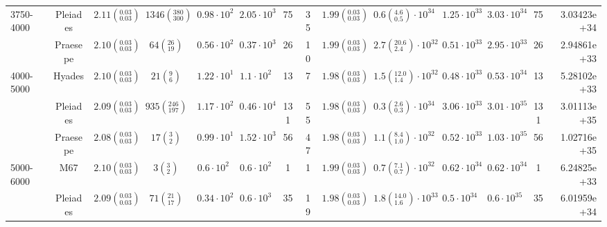 \begin{tabular}{lccccccccccccr}
3750-4000 & Pleiades &  $2.11\left(^{0.03}_{0.03}\right)$ &    $1346\left(^{380}_{300}\right)$ &    $0.98\cdot 10^{2}$ &    $2.05\cdot 10^{3}$ &                 75 &                 35 &  $1.99\left(^{0.03}_{0.03}\right)$ &   $0.6\left(^{4.6}_{0.5}\right)\cdot 10^{34}$ &       $1.25\cdot 10^{33}$ &       $3.03\cdot 10^{34}$ &                   75 &          3.03423e+34 \\
          & Praesepe &  $2.10\left(^{0.03}_{0.03}\right)$ &        $64\left(^{26}_{19}\right)$ &    $0.56\cdot 10^{2}$ &    $0.37\cdot 10^{3}$ &                 26 &                 10 &  $1.99\left(^{0.03}_{0.03}\right)$ &  $2.7\left(^{20.6}_{2.4}\right)\cdot 10^{32}$ &       $0.51\cdot 10^{33}$ &       $2.95\cdot 10^{33}$ &                   26 &          2.94861e+33 \\
4000-5000 & Hyades &  $2.10\left(^{0.03}_{0.03}\right)$ &          $21\left(^{9}_{6}\right)$ &    $1.22\cdot 10^{1}$ &     $1.1\cdot 10^{2}$ &                 13 &                  7 &  $1.98\left(^{0.03}_{0.03}\right)$ &  $1.5\left(^{12.0}_{1.4}\right)\cdot 10^{32}$ &       $0.48\cdot 10^{33}$ &       $0.53\cdot 10^{34}$ &                   13 &          5.28102e+33 \\
          & Pleiades &  $2.09\left(^{0.03}_{0.03}\right)$ &     $935\left(^{246}_{197}\right)$ &    $1.17\cdot 10^{2}$ &    $0.46\cdot 10^{4}$ &                131 &                 55 &  $1.98\left(^{0.03}_{0.03}\right)$ &   $0.3\left(^{2.6}_{0.3}\right)\cdot 10^{34}$ &       $3.06\cdot 10^{33}$ &       $3.01\cdot 10^{35}$ &                  131 &          3.01113e+35 \\
          & Praesepe &  $2.08\left(^{0.03}_{0.03}\right)$ &          $17\left(^{3}_{2}\right)$ &    $0.99\cdot 10^{1}$ &    $1.52\cdot 10^{3}$ &                 56 &                 47 &  $1.98\left(^{0.03}_{0.03}\right)$ &   $1.1\left(^{8.4}_{1.0}\right)\cdot 10^{32}$ &       $0.52\cdot 10^{33}$ &       $1.03\cdot 10^{35}$ &                   56 &          1.02716e+35 \\
5000-6000 & M67 &  $2.10\left(^{0.03}_{0.03}\right)$ &           $3\left(^{3}_{2}\right)$ &     $0.6\cdot 10^{2}$ &     $0.6\cdot 10^{2}$ &                  1 &                  1 &  $1.99\left(^{0.03}_{0.03}\right)$ &   $0.7\left(^{7.1}_{0.7}\right)\cdot 10^{32}$ &       $0.62\cdot 10^{34}$ &       $0.62\cdot 10^{34}$ &                    1 &          6.24825e+33 \\
          & Pleiades &  $2.09\left(^{0.03}_{0.03}\right)$ &        $71\left(^{21}_{17}\right)$ &    $0.34\cdot 10^{2}$ &     $0.6\cdot 10^{3}$ &                 35 &                 19 &  $1.98\left(^{0.03}_{0.03}\right)$ &  $1.8\left(^{14.0}_{1.6}\right)\cdot 10^{33}$ &        $0.5\cdot 10^{34}$ &        $0.6\cdot 10^{35}$ &                   35 &          6.01959e+34 \\

\end{tabular}
